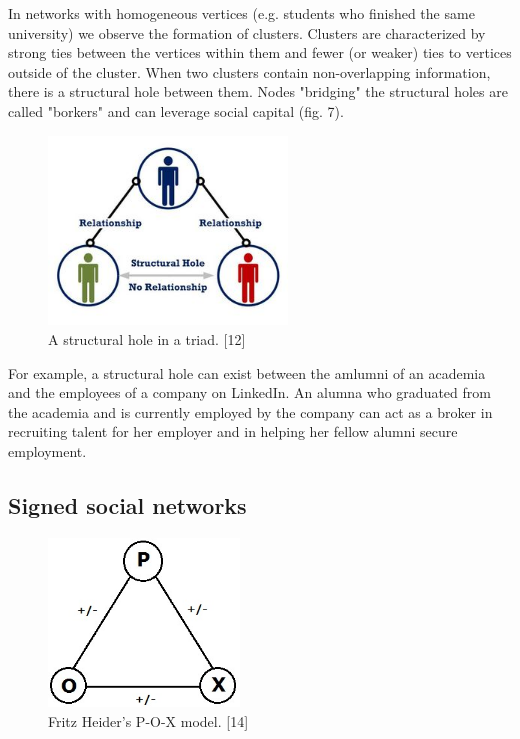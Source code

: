 \documentclass[conference,letterpaper]{IEEEtran}
\begin{document}
In networks with homogeneous vertices (e.g. students who finished the same university) we observe the formation of clusters. Clusters are characterized by strong ties between the vertices within them and fewer (or weaker) ties to vertices outside of the cluster. When two clusters contain non-overlapping information, there is a structural hole between them. Nodes "bridging" the structural holes are called "borkers" and can leverage social capital (fig. 7). \\
\begin{center}
\begin{figure}[hb]
\centering
\includegraphics[width=2.5in]{structural_hole}
\caption{
A structural hole in a triad. [12]
}
\label{fig_sim}
\end{figure}
\end{center}

For example, a structural hole can exist between the amlumni of an academia and the employees of a company on LinkedIn. An alumna who graduated from the academia and is currently employed by the company can act as a broker in recruiting talent for her employer and in helping her fellow alumni secure employment.\\

\subsection{Signed social networks}

\begin{center}
\begin{figure}[hb]
\centering
\includegraphics[width=2.0in]{pox}
\caption{
Fritz Heider's P-O-X model. [14]
}
\label{fig_sim}
\end{figure}
\end{center}
\end{document}
